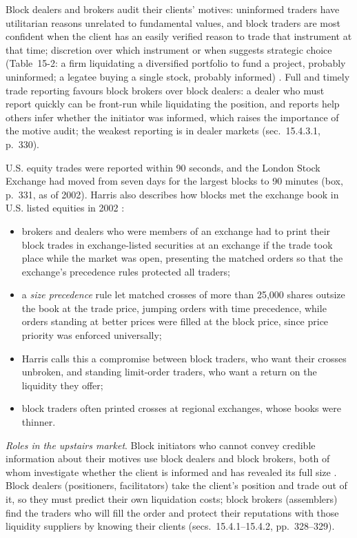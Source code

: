 \begin{qfdefinition}
Block dealers and brokers audit their clients' motives: uninformed traders have utilitarian reasons unrelated to fundamental values, and block traders are most confident when the client has an easily verified reason to trade that instrument at that time; discretion over which instrument or when suggests strategic choice (Table~15-2: a firm liquidating a diversified portfolio to fund a project, probably uninformed; a legatee buying a single stock, probably informed) \citep[same chap., sec.~15.4.4, pp.~330--331]{alpha-harris}. Full and timely trade reporting favours block brokers over block dealers: a dealer who must report quickly can be front-run while liquidating the position, and reports help others infer whether the initiator was informed, which raises the importance of the motive audit; the weakest reporting is in dealer markets (sec.~15.4.3.1, p.~330).

U.S. equity trades were reported within 90 seconds, and the London Stock Exchange had moved from seven days for the largest blocks to 90 minutes (box, p.~331, as of 2002). Harris also describes how blocks met the exchange book in U.S. listed equities in 2002 \citep[same chap., sec.~15.6.1, pp.~333--334]{alpha-harris}:
\begin{itemize}
\item brokers and dealers who were members of an exchange had to print their block trades in exchange-listed securities at an exchange if the trade took place while the market was open, presenting the matched orders so that the exchange's precedence rules protected all traders;
\item a \emph{size precedence} rule let matched crosses of more than 25{,}000 shares outsize the book at the trade price, jumping orders with time precedence, while orders standing at better prices were filled at the block price, since price priority was enforced universally;
\item Harris calls this a compromise between block traders, who want their crosses unbroken, and standing limit-order traders, who want a return on the liquidity they offer;
\item block traders often printed crosses at regional exchanges, whose books were thinner.
\end{itemize} \emph{Roles in the upstairs market}. Block initiators who cannot convey credible information about their motives use block dealers and block brokers, both of whom investigate whether the client is informed and has revealed its full size \citep[same chap., sec.~15.4, p.~328]{alpha-harris}. Block dealers (positioners, facilitators) take the client's position and trade out of it, so they must predict their own liquidation costs; block brokers (assemblers) find the traders who will fill the order and protect their reputations with those liquidity suppliers by knowing their clients (secs.~15.4.1--15.4.2, pp.~328--329).


\end{qfdefinition}
